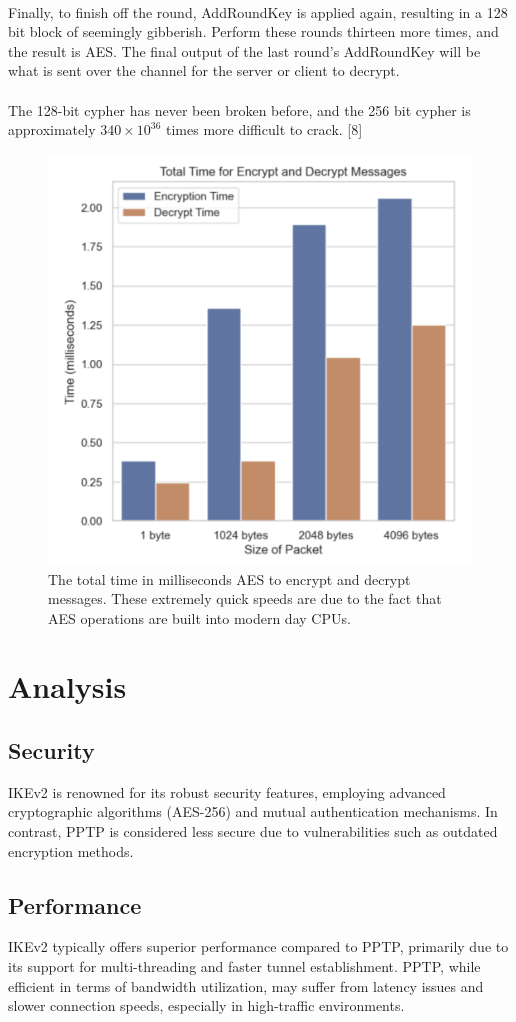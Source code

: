 \documentclass[runningheads]{llncs}
\begin{document}
\\
Finally, to finish off the round, AddRoundKey is applied again, resulting in a 128 bit block of seemingly gibberish. Perform these rounds thirteen more times, and the result is AES. The final output of the last round’s AddRoundKey will be what is sent over the channel for the server or client to decrypt.\\
\\
The 128-bit cypher has never been broken before, and the 256 bit cypher is approximately $340 \times 10^{36}$ times more difficult to crack. [8]
\begin{figure}[h]
    \centering
    \includegraphics[width=0.7\linewidth]{aes_1.png}
    \caption{The total time in milliseconds AES to encrypt and decrypt messages. These extremely quick speeds are due to the fact that AES operations are built into modern day CPUs.}
    \label{fig:Time for Encryption and Decryption using AES}
\end{figure}

\section{Analysis}
\subsection{Security}
IKEv2 is renowned for its robust security features, employing advanced cryptographic algorithms (AES-256) and mutual authentication mechanisms. In contrast, PPTP is considered less secure due to vulnerabilities such as outdated encryption methods.
\subsection{Performance}
IKEv2 typically offers superior performance compared to PPTP, primarily due to its support for multi-threading and faster tunnel establishment. PPTP, while efficient in terms of bandwidth utilization, may suffer from latency issues and slower connection speeds, especially in high-traffic environments.
\end{document}
